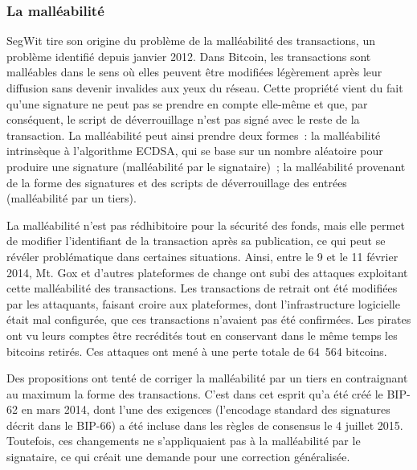 
\subsubsection*{La malléabilité} SegWit tire son origine du problème de la malléabilité des transactions, un problème identifié depuis janvier 2012. Dans Bitcoin, les transactions sont malléables dans le sens où elles peuvent être modifiées légèrement après leur diffusion sans devenir invalides aux yeux du réseau. Cette propriété vient du fait qu'une signature ne peut pas se prendre en compte elle-même et que, par conséquent, le script de déverrouillage n'est pas signé avec le reste de la transaction. La malléabilité peut ainsi prendre deux formes~: la malléabilité intrinsèque à l'algorithme ECDSA, qui se base sur un nombre aléatoire pour produire une signature (malléabilité par le signataire)~; la malléabilité provenant de la forme des signatures et des scripts de déverrouillage des entrées (malléabilité par un tiers).

La malléabilité n'est pas rédhibitoire pour la sécurité des fonds, mais elle permet de modifier l'identifiant de la transaction après sa publication, ce qui peut se révéler problématique dans certaines situations. Ainsi, entre le 9 et le 11 février 2014, Mt. Gox et d'autres plateformes de change ont subi des attaques exploitant cette malléabilité des transactions. Les transactions de retrait ont été modifiées par les attaquants, faisant croire aux plateformes, dont l'infrastructure logicielle était mal configurée, que ces transactions n'avaient pas été confirmées. Les pirates ont vu leurs comptes être recrédités tout en conservant dans le même temps les bitcoins retirés. Ces attaques ont mené à une perte totale de 64~564 bitcoins. %

Des propositions ont tenté de corriger la malléabilité par un tiers en contraignant au maximum la forme des transactions. C'est dans cet esprit qu'a été créé le BIP-62 en mars 2014, dont l'une des exigences (l'encodage standard des signatures décrit dans le BIP-66) a été incluse dans les règles de consensus le 4 juillet 2015. Toutefois, ces changements ne s'appliquaient pas à la malléabilité par le signataire, ce qui créait une demande pour une correction généralisée.

